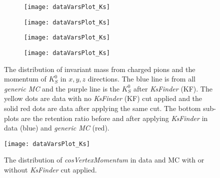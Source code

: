 \begin{figure}[htpb]
\begin{subfigure}{0.5\linewidth}
\texttt{[image: dataVarsPlot\_Ks]}
\end{subfigure}
\begin{subfigure}{0.5\linewidth}
\texttt{[image: dataVarsPlot\_Ks]}
\end{subfigure}
\bigskip
\begin{subfigure}{0.5\linewidth}
\texttt{[image: dataVarsPlot\_Ks]}
\end{subfigure}
\begin{subfigure}{0.5\linewidth}
\texttt{[image: dataVarsPlot\_Ks]}
\end{subfigure}
\caption{The distribution of invariant mass from charged pions and the momentum of $K_S^0$ in $x,y,z$ directions. The blue line is from all \textit{generic MC} and the purple line is the $K_S^0$ after \textit{KsFinder} (KF). The yellow dots are data with no \textit{KsFinder} (KF) cut applied and the solid red dots are data after applying the same cut. The bottom sub-plots are the retention ratio before and after applying \textit{KsFinder} in data (blue) and \textit{generic MC} (red).}
\label{fig:ksvalid_1}
\end{figure}

 \begin{figure}[htpb]
	\centering
	\texttt{[image: dataVarsPlot\_Ks]}
	\caption{The distribution of \textit{cosVertexMomentum} in data and MC with or without \textit{KsFinder} cut applied.}
	\label{fig:cosVex_dataMC}
\end{figure}

